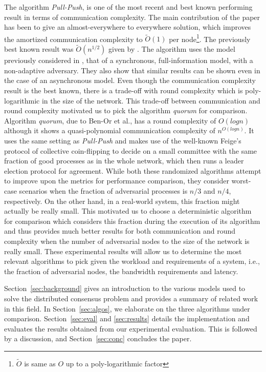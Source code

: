 The algorithm \textit{Pull-Push}, is one of the most recent and best known performing result in terms of communication complexity. The main contribution of the paper has been to give an almost-everywhere to everywhere solution, which improves the amortized communication complexity to $\tilde{O}(1)$ per node\footnote{$\tilde{O}$ is same as $O$ up to a poly-logarithmic factor}. The previously best known result was $\tilde{O}(n^{1/2})$ given by \cite{KLST11}. The algorithm uses the model previously considered in \cite{KLST11,KSSV06,BPV06,KS09}, that of a synchronous, full-information model, with a non-adaptive adversary. They also show that similar results can be shown even in the case of an asynchronous model. Even though the communication complexity result is the best known, there is a trade-off with round complexity which is poly-logarithmic in the size of the network. This trade-off between communication and round complexity motivated us to pick the algorithm \textit{quorum} for comparison. Algorithm \textit{quorum}, due to Ben-Or et al., has a round complexity of $O(logn)$ although it shows a quasi-polynomial communication complexity of $n^{O(logn)}$. It uses the same setting as \textit{Pull-Push} and makes use of the well-known Feige's protocol of collective coin-flipping to decide on a small committee with the same fraction of good processes as in the whole network, which then runs a leader election protocol for agreement. While both these randomized algorithms attempt to improve upon the metrics for performance comparison, they consider worst-case scenarios when the fraction of adversarial processes is $n/3$ and $n/4$, respectively. On the other hand, in a real-world system, this fraction might actually be really small. This motivated us to choose a deterministic algorithm for comparison which considers this fraction during the execution of its algorithm and thus provides much better results for both communication and round complexity when the number of adversarial nodes to the size of the network is really small. These experimental results will allow us to determine the most relevant algorithms to pick given the workload and requirements of a system, i.e., the fraction of adversarial nodes, the bandwidth requirements and latency. 


Section~\ref{sec:background} gives an introduction to the various models used to solve the distributed consensus problem and provides a summary of related work in this field. In Section~\ref{sec:algos}, we elaborate on the three algorithms under comparison. Section~\ref{sec:eval} and \ref{sec:results} details the implementation and evaluates the results obtained from our experimental evaluation. This is followed by a discussion, and Section~\ref{sec:conc} concludes the paper.

